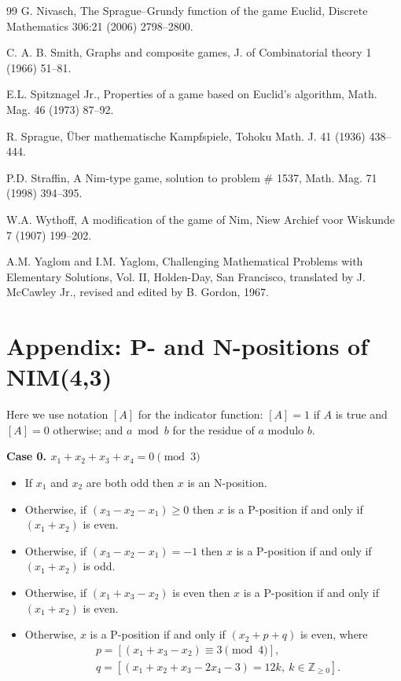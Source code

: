 \documentclass{article}
\theoremstyle{definition}
\begin{document}
\begin{thebibliography}{99}
G. Nivasch, 
The Sprague–Grundy function of the game Euclid, 
Discrete Mathematics 306:21 
(2006) 2798--2800.

C. A. B. Smith, Graphs and composite games,
J. of Combinatorial theory 1  (1966) 51--81.

E.L. Spitznagel Jr., 
Properties of a game based on Euclid’s algorithm, 
Math. Mag. 46 (1973) 87--92.

R. Sprague, Über mathematische Kampfspiele, 
Tohoku Math. J. 41 (1936) 438--444.

P.D. Straffin, A Nim-type game, solution to problem \# 1537, 
Math. Mag. 71 (1998) 394--395.

W.A. Wythoff, 
A modification of the game of Nim, 
Niew Archief voor Wiskunde 7 (1907) 199--202.


A.M. Yaglom and I.M. Yaglom, 
Challenging Mathematical Problems with Elementary Solutions, 
Vol. II, Holden-Day, San Francisco, 
translated by J. McCawley Jr., 
revised and edited by B. Gordon, 1967.

\end{thebibliography}

\appendix 

\section*{Appendix: P- and N-positions  of  NIM(4,3)}


Here we use notation $[A]$ for the indicator function: $[A]=1$ if $A$
is true and $[A]=0$ otherwise; and  $a \bmod b$ for the residue of $a$
modulo $b$.

\def\labelitemii{$\mathsurround=0pt \circ$}

\medskip

\textbf{Case 0. \boldmath $x_1 + x_2 + x_3 + x_4 = 0 \pmod3$}

\begin{itemize}
    \item If $x_1$ and $x_2$ are both odd then $x$ is an N-position.
    \item Otherwise, if $(x_3 - x_2 - x_1) \geq 0$ then 
    $x$ is a P-position if and only if $(x_1 + x_2)$ is even.
    \item Otherwise, if $(x_3 - x_2 - x_1) = -1$ then 
    $x$ is a P-position if and only if $(x_1 + x_2)$ is odd.
    \item Otherwise, if $(x_1 + x_3 - x_2)$ is even 
    then $x$ is a P-position if and only if $(x_1 + x_2)$ is even.
    \item Otherwise, $x$ is a P-position if and only if 
    $(x_2 + p + q)$ is even, where
\[
\begin{aligned}
  &p = \left[(x_1 + x_3 - x_2) \equiv 3 \pmod 4 \right],\\
  &q = \left[(x_1 + x_2 + x_3 - 2x_4 - 3) = 12k,\  k \in \mathbb{Z}_{\geq 0}\right]. 
\end{aligned}
\]
\end{itemize}
\end{document}
